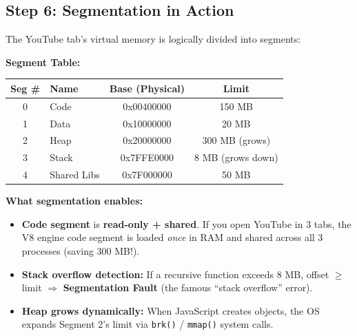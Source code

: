 \documentclass[12pt,a4paper]{article}
\begin{document}
\subsection{Step 6: Segmentation in Action}

The YouTube tab's virtual memory is logically divided into segments:

\begin{center}
\end{center}

\textbf{Segment Table:}
\begin{center}
\begin{tabular}{@{} c l c c @{}}
\toprule
\textbf{Seg \#} & \textbf{Name} & \textbf{Base (Physical)} & \textbf{Limit} \\
\midrule
0 & Code & 0x00400000 & 150 MB \\
1 & Data & 0x10000000 & 20 MB \\
2 & Heap & 0x20000000 & 300 MB (grows) \\
3 & Stack & 0x7FFE0000 & 8 MB (grows down) \\
4 & Shared Libs & 0x7F000000 & 50 MB \\
\bottomrule
\end{tabular}
\end{center}

\textbf{What segmentation enables:}
\begin{itemize}[leftmargin=*]
    \item \textbf{Code segment} is \textbf{read-only + shared}. If you open YouTube in 3 tabs, the V8 engine code segment is loaded \textit{once} in RAM and shared across all 3 processes (saving 300 MB!).
    \item \textbf{Stack overflow detection:} If a recursive function exceeds 8 MB, offset $\geq$ limit $\Rightarrow$ \textbf{Segmentation Fault} (the famous ``stack overflow'' error).
    \item \textbf{Heap grows dynamically:} When JavaScript creates objects, the OS expands Segment 2's limit via \texttt{brk()} / \texttt{mmap()} system calls.
\end{itemize}
\end{document}
